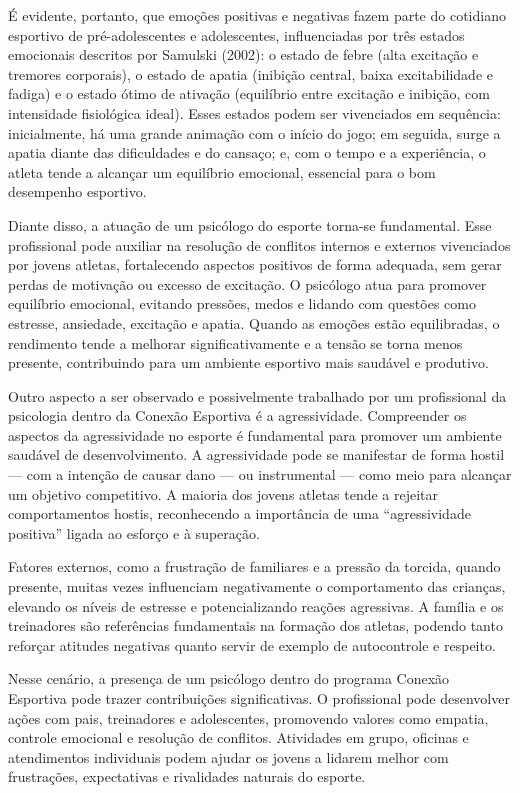 \begin{Desenvolvimento}
É evidente, portanto, que emoções positivas e negativas fazem parte do cotidiano esportivo de pré-adolescentes e adolescentes, influenciadas por três estados emocionais descritos por Samulski (2002): o estado de febre (alta excitação e tremores corporais), o estado de apatia (inibição central, baixa excitabilidade e fadiga) e o estado ótimo de ativação (equilíbrio entre excitação e inibição, com intensidade fisiológica ideal). Esses estados podem ser vivenciados em sequência: inicialmente, há uma grande animação com o início do jogo; em seguida, surge a apatia diante das dificuldades e do cansaço; e, com o tempo e a experiência, o atleta tende a alcançar um equilíbrio emocional, essencial para o bom desempenho esportivo.

Diante disso, a atuação de um psicólogo do esporte torna-se fundamental. Esse profissional pode auxiliar na resolução de conflitos internos e externos vivenciados por jovens atletas, fortalecendo aspectos positivos de forma adequada, sem gerar perdas de motivação ou excesso de excitação. O psicólogo atua para promover equilíbrio emocional, evitando pressões, medos e lidando com questões como estresse, ansiedade, excitação e apatia. Quando as emoções estão equilibradas, o rendimento tende a melhorar significativamente e a tensão se torna menos presente, contribuindo para um ambiente esportivo mais saudável e produtivo.

Outro aspecto a ser observado e possivelmente trabalhado por um profissional da psicologia dentro da Conexão Esportiva é a agressividade. Compreender os aspectos da agressividade no esporte é fundamental para promover um ambiente saudável de desenvolvimento. A agressividade pode se manifestar de forma hostil — com a intenção de causar dano — ou instrumental — como meio para alcançar um objetivo competitivo. A maioria dos jovens atletas tende a rejeitar comportamentos hostis, reconhecendo a importância de uma “agressividade positiva” ligada ao esforço e à superação.

Fatores externos, como a frustração de familiares e a pressão da torcida, quando presente, muitas vezes influenciam negativamente o comportamento das crianças, elevando os níveis de estresse e potencializando reações agressivas. A família e os treinadores são referências fundamentais na formação dos atletas, podendo tanto reforçar atitudes negativas quanto servir de exemplo de autocontrole e respeito.

Nesse cenário, a presença de um psicólogo dentro do programa Conexão Esportiva pode trazer contribuições significativas. O profissional pode desenvolver ações com pais, treinadores e adolescentes, promovendo valores como empatia, controle emocional e resolução de conflitos. Atividades em grupo, oficinas e atendimentos individuais podem ajudar os jovens a lidarem melhor com frustrações, expectativas e rivalidades naturais do esporte.


\end{Desenvolvimento}
